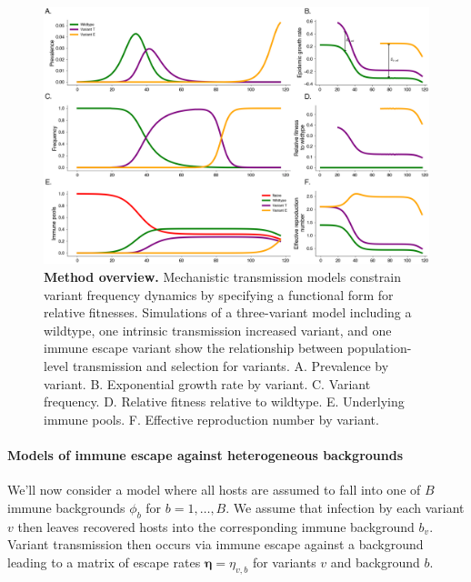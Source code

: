 \documentclass[12pt,oneside,letterpaper]{article}
\renewcommand{\vec}[1]{\boldsymbol{#1}}
\def\tbc#1{\textcolor{purple}{[#1]}}
\begin{document}
\begin{figure}[h]
    \centering
    \includegraphics[width=1.0\linewidth]{./figures/vis_mechanisms.png}
    \caption{\textbf{Method overview.}
    Mechanistic transmission models constrain variant frequency dynamics by specifying a functional form for relative fitnesses.
    Simulations of a three-variant model including a wildtype, one intrinsic transmission increased variant, and one immune escape variant show the relationship between population-level transmission and selection for variants.
    A. Prevalence by variant.
    B. Exponential growth rate by variant.
    C. Variant frequency.
    D. Relative fitness relative to wildtype.
    E. Underlying immune pools.
    F. Effective reproduction number by variant.
}%
    \label{fig:vis_mechanisms}
\end{figure}

\paragraph{Models of immune escape against heterogeneous backgrounds}%

We'll now consider a model where all hosts are assumed to fall into one of $B$ immune backgrounds $\phi_{b}$ for $b =1, \ldots, B$.
We assume that infection by each variant $v$ then leaves recovered hosts into the corresponding immune background $b_{v}$.
Variant transmission then occurs via immune escape against a background leading to a matrix of escape rates $\vec{\eta} = \eta_{v,b}$ for variants $v$ and background $b$.
\end{document}
